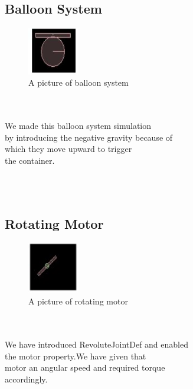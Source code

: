 \subsection{Balloon System}
\begin{figure}
	\caption{A picture of balloon system}
	\centering
	 \includegraphics[width=0.2\textwidth]{balloon.jpg}%
\end{figure}
\begin{frame}
\centering
\\
\\
We made this balloon system simulation\\by introducing the negative gravity because of \\which they move upward to trigger \\the container.
\end{frame}
\\
\\
\subsection{Rotating Motor}
\begin{figure}
	\caption{A picture of rotating motor}
	\centering
	 \includegraphics[width=0.2\textwidth]{motor.jpg}%
\end{figure}
\begin{frame}
\centering
\\
\\
We have introduced RevoluteJointDef and enabled \\the motor property.We have given that\\ motor an angular speed and required torque\\ accordingly.
\end{frame}
\\
\\
